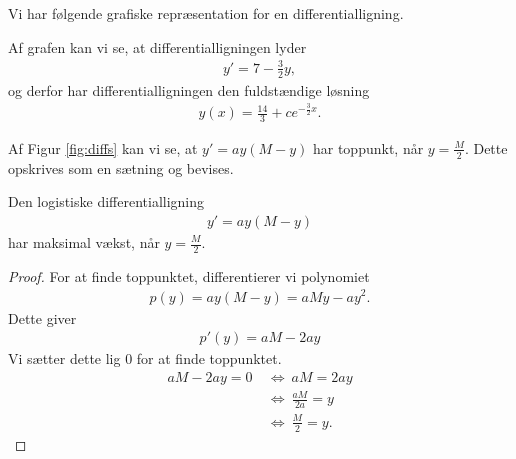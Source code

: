 \begin{exa}
	Vi har følgende grafiske repræsentation for en differentialligning.
	\begin{center}
	\end{center}
	Af grafen kan vi se, at differentialligningen lyder
	\begin{align*}
		y' = 7-\frac{3}{2}y,
	\end{align*}
	og derfor har differentialligningen den fuldstændige løsning
	\begin{align*}
		y(x) = \frac{14}{3} + ce^{-\frac{3}{2}x}.
	\end{align*}
\end{exa}
Af Figur \ref{fig:diffs} kan vi se, at $y' = ay(M - y)$ har toppunkt, når $y = \frac{M}{2}$. Dette opskrives som en sætning og bevises. 
\begin{setn}
	Den logistiske differentialligning 
	\begin{align*}
		y' = ay(M-y)
	\end{align*}
	har maksimal vækst, når $y = \frac{M}{2}$. 
\end{setn}
\begin{proof}
	For at finde toppunktet, differentierer vi polynomiet 
	\begin{align*}
		p(y) =ay(M-y) = aMy-ay^2.
	\end{align*}
	Dette giver
	\begin{align*}
		p'(y) = aM-2ay
	\end{align*}
	Vi sætter dette lig 0 for at finde toppunktet.
	\begin{align*}
		aM-2ay = 0 \ &\Leftrightarrow \ aM = 2ay \\
		&\Leftrightarrow	 \ \frac{aM}{2a} = y \\
		&\Leftrightarrow	 \ \frac{M}{2} = y.
	\end{align*}
\end{proof}

